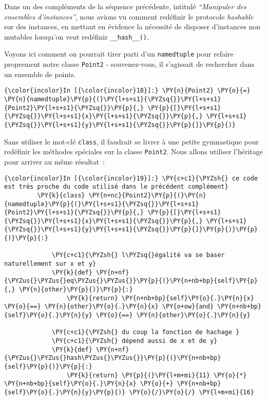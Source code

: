     Dans un des compléments de la séquence précédente, intitulé
\emph{``Manipuler des ensembles d'instances''}, nous avions vu comment
redéfinir le protocole \emph{hashable} sur des instances, en mettant en
évidence la nécessité de disposer d'instances non mutables lorsqu'on
veut redéfinir \texttt{\_\_hash\_\_()}.

Voyons ici comment on pourrait tirer parti d'un \texttt{namedtuple} pour
refaire proprement notre classe \texttt{Point2} - souvenez-vous, il
s'agissait de rechercher dans un ensemble de points.

    \begin{Verbatim}[commandchars=\\\{\}]
{\color{incolor}In [{\color{incolor}18}]:} \PY{n}{Point2} \PY{o}{=} \PY{n}{namedtuple}\PY{p}{(}\PY{l+s+s1}{\PYZsq{}}\PY{l+s+s1}{Point2}\PY{l+s+s1}{\PYZsq{}}\PY{p}{,} \PY{p}{[}\PY{l+s+s1}{\PYZsq{}}\PY{l+s+s1}{x}\PY{l+s+s1}{\PYZsq{}}\PY{p}{,} \PY{l+s+s1}{\PYZsq{}}\PY{l+s+s1}{y}\PY{l+s+s1}{\PYZsq{}}\PY{p}{]}\PY{p}{)}
\end{Verbatim}


    Sans utiliser le mot-clé \texttt{class}, il faudrait se livrer à une
petite gymnastique pour redéfinir les méthodes spéciales sur la classe
\texttt{Point2}. Nous allons utiliser l'héritage pour arriver au même
résultat~:

    \begin{Verbatim}[commandchars=\\\{\}]
{\color{incolor}In [{\color{incolor}19}]:} \PY{c+c1}{\PYZsh{} ce code est très proche du code utilisé dans le précédent complément}
         \PY{k}{class} \PY{n+nc}{Point2}\PY{p}{(}\PY{n}{namedtuple}\PY{p}{(}\PY{l+s+s1}{\PYZsq{}}\PY{l+s+s1}{Point2}\PY{l+s+s1}{\PYZsq{}}\PY{p}{,} \PY{p}{[}\PY{l+s+s1}{\PYZsq{}}\PY{l+s+s1}{x}\PY{l+s+s1}{\PYZsq{}}\PY{p}{,} \PY{l+s+s1}{\PYZsq{}}\PY{l+s+s1}{y}\PY{l+s+s1}{\PYZsq{}}\PY{p}{]}\PY{p}{)}\PY{p}{)}\PY{p}{:}
         
             \PY{c+c1}{\PYZsh{} l\PYZsq{}égalité va se baser naturellement sur x et y}
             \PY{k}{def} \PY{n+nf}{\PYZus{}\PYZus{}eq\PYZus{}\PYZus{}}\PY{p}{(}\PY{n+nb+bp}{self}\PY{p}{,} \PY{n}{other}\PY{p}{)}\PY{p}{:}
                 \PY{k}{return} \PY{n+nb+bp}{self}\PY{o}{.}\PY{n}{x} \PY{o}{==} \PY{n}{other}\PY{o}{.}\PY{n}{x} \PY{o+ow}{and} \PY{n+nb+bp}{self}\PY{o}{.}\PY{n}{y} \PY{o}{==} \PY{n}{other}\PY{o}{.}\PY{n}{y}
         
             \PY{c+c1}{\PYZsh{} du coup la fonction de hachage }
             \PY{c+c1}{\PYZsh{} dépend aussi de x et de y}
             \PY{k}{def} \PY{n+nf}{\PYZus{}\PYZus{}hash\PYZus{}\PYZus{}}\PY{p}{(}\PY{n+nb+bp}{self}\PY{p}{)}\PY{p}{:}
                 \PY{k}{return} \PY{p}{(}\PY{l+m+mi}{11} \PY{o}{*} \PY{n+nb+bp}{self}\PY{o}{.}\PY{n}{x} \PY{o}{+} \PY{n+nb+bp}{self}\PY{o}{.}\PY{n}{y}\PY{p}{)} \PY{o}{/}\PY{o}{/} \PY{l+m+mi}{16}
\end{Verbatim}


